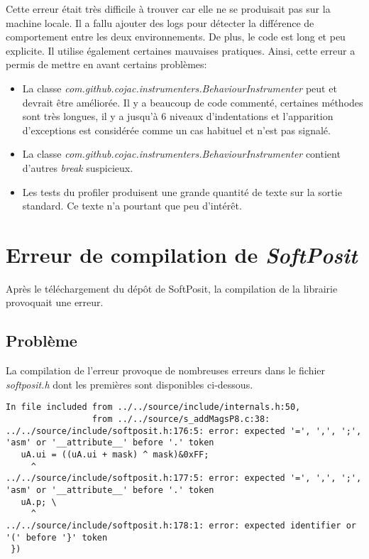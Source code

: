 Cette erreur était très difficile à trouver car elle ne se produisait pas sur la machine locale. Il a fallu ajouter des logs pour détecter la différence de comportement entre les deux environnements. De plus, le code est long et peu explicite. Il utilise également certaines mauvaises pratiques. Ainsi, cette erreur a permis de mettre en avant certains problèmes:

\begin{itemize}
    \item La classe \textit{com.github.cojac.instrumenters.BehaviourInstrumenter} peut et devrait être améliorée. Il y a beaucoup de code commenté, certaines méthodes sont très longues, il y a jusqu'à 6 niveaux d'indentations et l'apparition d'exceptions est considérée comme un cas habituel et n'est pas signalé.
    \item La classe \textit{com.github.cojac.instrumenters.BehaviourInstrumenter} contient d'autres \textit{break} suspicieux.
    \item Les tests du profiler produisent une grande quantité de texte sur la sortie standard. Ce texte n'a pourtant que peu d'intérêt.
\end{itemize}

\section{Erreur de compilation de \textit{SoftPosit}}
\label{sec:problem_softposit_compilation}

Après le téléchargement du dépôt de \gls{SoftPosit}, la compilation de la librairie provoquait une erreur.

\subsection{Problème}

La compilation de l'erreur provoque de nombreuses erreurs dans le fichier \textit{softposit.h} dont les premières sont disponibles ci-dessous.

\begin{verbatim}
In file included from ../../source/include/internals.h:50,
                 from ../../source/s_addMagsP8.c:38:
../../source/include/softposit.h:176:5: error: expected '=', ',', ';', 'asm' or '__attribute__' before '.' token
   uA.ui = ((uA.ui + mask) ^ mask)&0xFF;
     ^
../../source/include/softposit.h:177:5: error: expected '=', ',', ';', 'asm' or '__attribute__' before '.' token
   uA.p; \
     ^
../../source/include/softposit.h:178:1: error: expected identifier or '(' before '}' token
 })
\end{verbatim}


